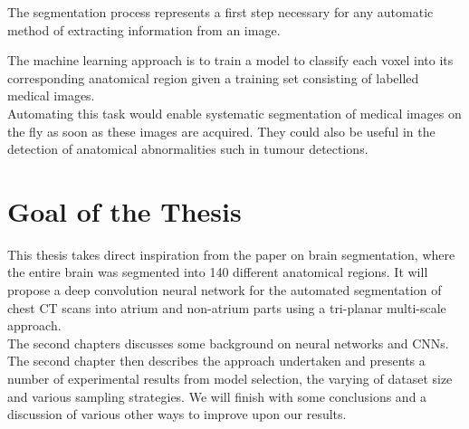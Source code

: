 The segmentation process represents a first step necessary for any automatic method of extracting information from an image.

The machine learning approach is to train a model to classify each voxel into its corresponding anatomical region given a training set consisting of labelled medical images.\\

Automating this task would enable systematic segmentation of medical images on the fly as soon as these images are acquired. They could also be useful in the detection of anatomical abnormalities such in tumour detections.\\

\section{Goal of the Thesis}

This thesis takes direct inspiration from the paper on brain segmentation, where the entire brain was segmented into 140 different anatomical regions. It will propose a deep convolution neural network for the automated segmentation of chest CT scans into atrium and non-atrium parts using a tri-planar multi-scale approach. \\

The second chapters discusses some background on neural networks and CNNs. The second chapter then describes the approach undertaken and presents a number of experimental results from model selection, the varying of dataset size and various sampling strategies. We will finish with some conclusions and a discussion of various other ways to improve upon our results.










